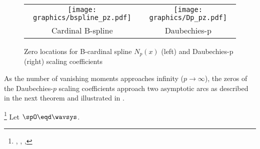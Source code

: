 \begin{figure}
  \centering%
  \begin{tabular*}{\textwidth-40mm}{@{\extracolsep{\fill}}cc}%
    \texttt{[image: graphics/bspline\_pz.pdf]}&\texttt{[image: graphics/Dp\_pz.pdf]}\\%
    Cardinal B-spline&Daubechies-p%
  \end{tabular*}%
  \caption{
     Zero locations for B-cardinal spline $N_p(x)$ (left) and
     Daubechies-p (right) scaling coefficients
     \label{fig:Dp_limits}
     }
\end{figure}

%  

As the number of vanishing moments approaches infinity ($p\to\infty$),
the zeros of the Daubechies-$p$ scaling coefficients approach two
asymptotic arcs as described in the next theorem and illustrated in
.
\begin{lemma}
\footnote{
  ,
  ,
  ,
  }
\label{lem:QzQz_zeros}
Let $\spO\eqd\wavsys$.
\end{lemma}

